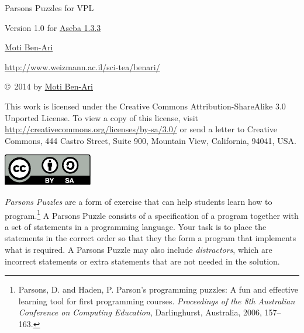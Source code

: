 \documentclass[11pt,a4paper,english]{report}
\begin{document}
\thispagestyle{empty}

\begin{center}
\begin{Huge}
\begin{bfseries}
Parsons Puzzles for VPL
\end{bfseries}
\end{Huge}

\bigskip
\bigskip

\begin{Large}
Version 1.0
for \href{https://aseba.wikidot.com/en:downloadinstall}{Aseba 1.3.3}
\end{Large}


\bigskip
\bigskip
\bigskip
\bigskip
\bigskip

\begin{LARGE}
\href{http://www.weizmann.ac.il/sci-tea/benari/}{Moti Ben-Ari}
\end{LARGE}

\begin{Large}
\href{http://www.weizmann.ac.il/sci-tea/benari/}{http://www.weizmann.ac.il/sci-tea/benari/}
\end{Large}

\end{center}

\vfill

\begin{center}
\copyright{}\  2014 by \href{http://www.weizmann.ac.il/sci-tea/benari/}{Moti Ben-Ari}%
\end{center}

This work is licensed under the Creative Commons
Attribution-ShareAlike 3.0 Unported License. To view a copy
of this license, visit
\url{http://creativecommons.org/licenses/by-sa/3.0/}
or send a letter to Creative Commons, 444 Castro Street, Suite 900,
Mountain View, California, 94041, USA.

\begin{center}
\includegraphics[width=.2\textwidth]{by-sa}
\end{center}

\newpage
\thispagestyle{empty}
\setcounter{page}{1}


\emph{Parsons Puzzles} are a form of exercise that can help students
learn how to program.\footnote{Parsons, D. and Haden, P. Parson’s
programming puzzles: A fun and effective learning tool for first
programming courses. \textit{Proceedings of the 8th Australian
Conference on Computing Education}, Darlinghurst, Australia, 2006,
157–163.} A Parsons Puzzle consists of a specification of a program
together with a set of statements in a programming language. Your task
is to place the statements in the correct order so that they the form a
program that implements what is required. A Parsons Puzzle may also
include \emph{distractors}, which are incorrect statements or extra
statements that are not needed in the solution.
\end{document}

